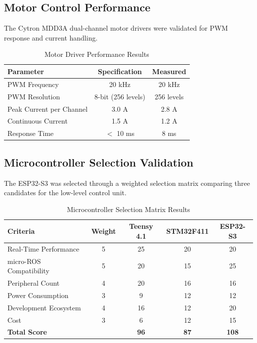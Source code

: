 \subsection{Motor Control Performance}

The Cytron MDD3A dual-channel motor drivers were validated for PWM response and current handling.

\begin{table}[H]
\centering
\caption{Motor Driver Performance Results}
\label{tab:motor_driver_results}
\begin{tabular}{|l|c|c|}
\hline
\textbf{Parameter} & \textbf{Specification} & \textbf{Measured} \\
\hline
PWM Frequency & 20 kHz & 20 kHz \\
PWM Resolution & 8-bit (256 levels) & 256 levels \\
Peak Current per Channel & 3.0 A & 2.8 A \\
Continuous Current & 1.5 A & 1.2 A \\
Response Time & $<$ 10 ms & 8 ms \\
\hline
\end{tabular}
\end{table}

\subsection{Microcontroller Selection Validation}

The ESP32-S3 was selected through a weighted selection matrix comparing three candidates for the low-level control unit.

\begin{table}[H]
\centering
\caption{Microcontroller Selection Matrix Results}
\label{tab:mcu_selection_results}
\begin{tabular}{|l|c|c|c|c|}
\hline
\textbf{Criteria} & \textbf{Weight} & \textbf{Teensy 4.1} & \textbf{STM32F411} & \textbf{ESP32-S3} \\
\hline
Real-Time Performance & 5 & 25 & 20 & 20 \\
micro-ROS Compatibility & 5 & 20 & 15 & 25 \\
Peripheral Count & 4 & 20 & 16 & 16 \\
Power Consumption & 3 & 9 & 12 & 12 \\
Development Ecosystem & 4 & 16 & 12 & 20 \\
Cost & 3 & 6 & 12 & 15 \\
\hline
\textbf{Total Score} & & \textbf{96} & \textbf{87} & \textbf{108} \\
\hline
\end{tabular}
\end{table}

